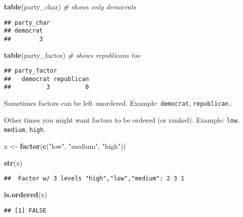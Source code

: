 \documentclass[
]{book}
\newenvironment{Shaded}{\begin{snugshade}}{\end{snugshade}}
\newcommand{\CommentTok}[1]{\textcolor[rgb]{0.56,0.35,0.01}{\textit{#1}}}
\newcommand{\KeywordTok}[1]{\textcolor[rgb]{0.13,0.29,0.53}{\textbf{#1}}}
\newcommand{\NormalTok}[1]{#1}
\newcommand{\StringTok}[1]{\textcolor[rgb]{0.31,0.60,0.02}{#1}}
\begin{document}
\begin{Shaded}
\begin{Highlighting}[]
\KeywordTok{table}\NormalTok{(party\_char) }\CommentTok{\# shows only democrats}
\end{Highlighting}
\end{Shaded}

\begin{verbatim}
## party_char
## democrat 
##        3
\end{verbatim}

\begin{Shaded}
\begin{Highlighting}[]
\KeywordTok{table}\NormalTok{(party\_factor) }\CommentTok{\# shows republicans too}
\end{Highlighting}
\end{Shaded}

\begin{verbatim}
## party_factor
##   democrat republican 
##          3          0
\end{verbatim}

Sometimes factors can be left unordered. Example: \texttt{democrat}, \texttt{republican.}

Other times you might want factors to be ordered (or ranked). Example: \texttt{low}, \texttt{medium}, \texttt{high}.

\begin{Shaded}
\begin{Highlighting}[]
\NormalTok{x \textless{}{-}}\StringTok{ }\KeywordTok{factor}\NormalTok{(}\KeywordTok{c}\NormalTok{(}\StringTok{"low"}\NormalTok{, }\StringTok{"medium"}\NormalTok{, }\StringTok{"high"}\NormalTok{))}

\KeywordTok{str}\NormalTok{(x)}
\end{Highlighting}
\end{Shaded}

\begin{verbatim}
##  Factor w/ 3 levels "high","low","medium": 2 3 1
\end{verbatim}

\begin{Shaded}
\begin{Highlighting}[]
\KeywordTok{is.ordered}\NormalTok{(x)}
\end{Highlighting}
\end{Shaded}

\begin{verbatim}
## [1] FALSE
\end{verbatim}
\end{document}
